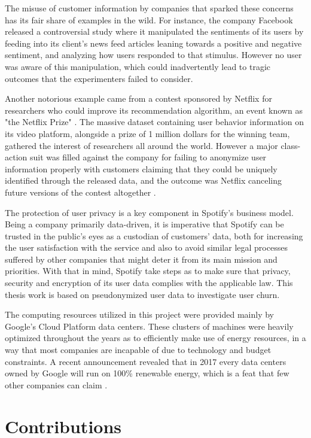 \documentclass{kththesis}
\begin{document}
The misuse of customer information by companies that sparked these concerns has its fair share of examples in the wild. For instance, the company Facebook released a controversial study where it manipulated the sentiments of its users by feeding into its client's news feed articles leaning towards a positive and negative sentiment, and analyzing how users responded to that stimulus\citep{kramer2014experimental}. However no user was aware of this manipulation, which could inadvertently lead to tragic outcomes that the experimenters failed to consider. 

Another notorious example came from a contest sponsored by Netflix for researchers who could improve its recommendation algorithm, an event known as "the Netflix Prize" \citep{bennett2007netflix}. The massive dataset containing user behavior information on its video platform, alongside a prize of 1 million dollars for the winning team, gathered the interest of researchers all around the world. However a major class-action suit was filled against the company for failing to anonymize user information properly with customers claiming that they could be uniquely identified through the released data, and the outcome was Netflix canceling future versions of the contest altogether \citep{wired2010netflix}.

The protection of user privacy is a key component in Spotify's business model. Being a company primarily data-driven, it is imperative that Spotify can be trusted in the public's eyes as a custodian of customers' data, both for increasing the user satisfaction with the service and also to avoid similar legal processes suffered by other companies that might deter it from its main mission and priorities. With that in mind, Spotify take steps as to make sure that privacy, security and encryption of its user data complies with the applicable law. This thesis work is based on pseudonymized user data to investigate user churn. 

The computing resources utilized in this project were provided mainly by Google's Cloud Platform data centers. These clusters of machines were heavily optimized throughout the years as to efficiently make use of energy resources, in a way that most companies are incapable of due to technology and budget constraints. A recent announcement revealed that in 2017 every data centers owned by Google will run on 100\% renewable energy, which is a feat that few other companies can claim \citep{google2017renew}.  

\section{Contributions}
\end{document}
